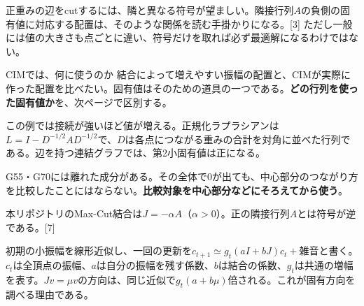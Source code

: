正重みの辺をcutするには、隣と異なる符号が望ましい。隣接行列$A$の負側の固有値に対応する配置は、そのような関係を読む手掛かりになる。[3] ただし一般には値の大きさも点ごとに違い、符号だけを取れば必ず最適解になるわけではない。

\begin{point}{CIMでは、何に使うのか}
結合によって増えやすい振幅の配置と、CIMが実際に作った配置を比べたい。固有値はそのための道具の一つである。\textbf{どの行列を使った固有値か}を、次ページで区別する。
\end{point}

\newpage
{}
この例では接続が強いほど値が増える。正規化ラプラシアンは$L=I-D^{-1/2}AD^{-1/2}$で、$D$は各点につながる重みの合計を対角に並べた行列である。辺を持つ連結グラフでは、第2小固有値は正になる。

G55・G70には離れた成分がある。その全体で0が出ても、中心部分のつながり方を比較したことにはならない。\textbf{比較対象を中心部分などにそろえてから使う}。

本リポジトリのMax-Cut結合は$J=-\alpha A$（$\alpha>0$）。正の隣接行列$A$とは符号が逆である。[7]
\begin{center}
\end{center}
初期の小振幅を線形近似し、一回の更新を$c_{t+1}\simeq g_t(aI+bJ)c_t+\text{雑音}$と書く。$c_t$は全頂点の振幅、$a$は自分の振幅を残す係数、$b$は結合の係数、$g_t$は共通の増幅を表す。$Jv=\mu v$の方向は、同じ近似で$g_t(a+b\mu)$倍される。これが固有方向を調べる理由である。

